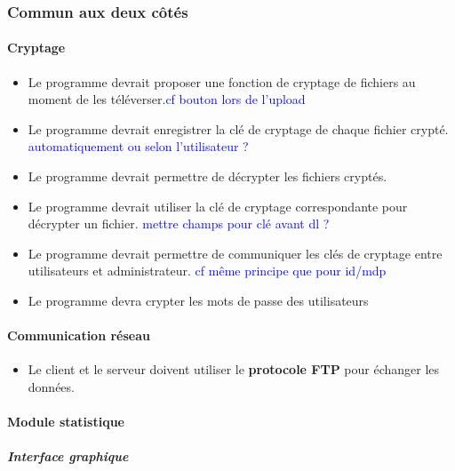 \documentclass[10pt,a4paper]{report}
\begin{document}
\subsubsection{Commun aux deux côtés}
\paragraph{Cryptage}
	\begin{itemize}[label = $\triangleright$]
		\item Le programme devrait proposer une fonction de cryptage de fichiers au moment de les téléverser.\textcolor{blue}{cf bouton lors de l'upload}
		\item Le programme devrait enregistrer la clé de cryptage de chaque fichier crypté. \textcolor{blue}{automatiquement ou selon l'utilisateur ?}
		\item Le programme devrait permettre de décrypter les fichiers cryptés.
		\item Le programme devrait utiliser la clé de cryptage correspondante pour décrypter un fichier. \textcolor{blue}{mettre champs pour clé avant dl ?}
		\item Le programme devrait permettre de communiquer les clés de cryptage entre utilisateurs et administrateur. \textcolor{blue}{cf même principe que pour id/mdp}
		\item Le programme devra crypter les mots de passe des utilisateurs
	\end{itemize}
	
\paragraph{Communication réseau}

	\begin{itemize}[label = $\triangleright$]
		\item Le client et le serveur doivent utiliser le \textbf{protocole FTP} pour échanger les données.
	\end{itemize}
	
\paragraph{Module statistique }

	\subparagraph{Interface graphique}
	
\end{document}
